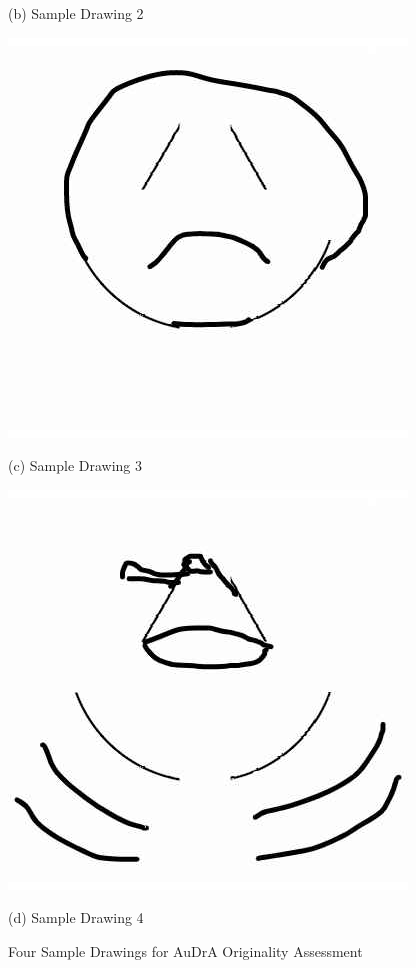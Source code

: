 \documentclass[../Proposal.tex]{subfiles}
\begin{document}
\begin{figure}[]
\begin{minipage}{0.45\textwidth}
        \caption*{(b) Sample Drawing 2}
    \end{minipage}
    \vspace{0.5cm}
    \begin{minipage}{0.45\textwidth}
        \centering
        \includegraphics[width=\linewidth]{sample_drawing_AuDrA/example3.jpg}
        \caption*{(c) Sample Drawing 3}
    \end{minipage}\hfill
    \begin{minipage}{0.45\textwidth}
        \centering
        \includegraphics[width=\linewidth]{sample_drawing_AuDrA/example4.jpg}
        \caption*{(d) Sample Drawing 4}
    \end{minipage}
    \caption{Four Sample Drawings for AuDrA Originality Assessment}
    \label{fig: sample_drawing_AuDrA}
\end{figure}
\end{document}
